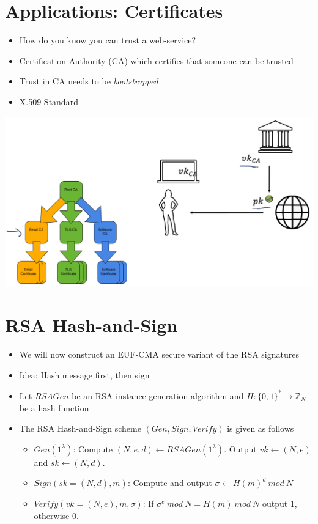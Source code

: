 \section{Applications: Certificates}
    \begin{itemize}
        \item How do you know you can trust a web-service?
        \item Certification Authority (CA) which certifies that someone can be trusted
        \item Trust in CA needs to be \textit{bootstrapped}
        \item X.509 Standard
    \end{itemize}
    \begin{center}
	    \includegraphics[width=160mm]{Graphics/Digital Signatures/ds4.png}
    \end{center}

\section{RSA Hash-and-Sign}
    \begin{itemize}
        \item We will now construct an EUF-CMA secure variant of the RSA signatures
        \item Idea: Hash message first, then sign
        \item Let $RSAGen$ be an RSA instance generation algorithm and $H: \{0,1\}^* \rightarrow \mathbb{Z}_N$ be a hash function
        \item The RSA Hash-and-Sign scheme $(Gen,Sign,Verify)$ is given as follows
        \begin{itemize}
            \item $Gen(1^{\lambda})$: Compute $(N,e,d) \leftarrow RSAGen(1^{\lambda})$.
            Output $vk \leftarrow (N,e)$ and $sk \leftarrow (N,d)$.
            \item $Sign(sk=(N,d),m)$: Compute and output $\sigma \leftarrow H(m)^d \ mod\ N$
            \item $Verify(vk=(N,e),m,\sigma)$: If $\sigma^e \ mod\ N = H(m) \ mod\ N$ output 1, otherwise 0.
        \end{itemize}
    \end{itemize}

